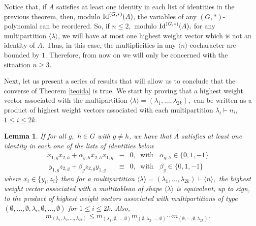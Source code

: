 \documentclass{amsart}
\newcommand{\IdG}{\ensuremath{\textnormal{Id}^{(G,\ast)}}}
\newtheorem{lema}[teorema]{Lemma}
\numberwithin{equation}{section}
\begin{document}
Notice that, if $A$ satisfies at least one identity in each list of identities in the previous theorem, then, modulo $\IdG(A)$, the variables of any $(G,*)$-polynomial can be reordered. So, if $n\leq 2,$ modulo $\IdG(A),$ for any multipartition $\langle \lambda \rangle$, we will have at most one highest weight vector which is not an identity of $A$. Thus, in this case, the multiplicities in any $\langle n \rangle$-cocharacter are bounded by $1.$ Therefore, from now on we will only be concerned with the situation $n\geq 3$.

Next, let us present a series of results that will allow us to conclude that the converse of Theorem \ref{teoida} is true. 
We start by proving that a highest weight vector associated with the multipartition $\langle \lambda \rangle = (\lambda_1,  \ldots, \lambda_{2k}), $ can be written as a product of highest weight vectors  associated with each multipartition $\lambda_{i}\vdash n_i,$ $1\leq i\leq 2k.$ 

\begin{lema}
	\label{obsum} 
If	for all $g,$ $ h \in G$ with $g \neq h$, %
    we have that
	$A$ satisfies
	at least one identity in each one of the lists of identities below 
$$\begin{array}{lcl} x_{1,g}x_{2,h}+\alpha_{g,h}x_{2,h}x_{1,g}&\equiv& 0, \;\; \mbox{with} \;\;\; \alpha_{g,h} \in \{0, 1, -1\}  \\
    ~ y_{1,g}z_{2,g}+\beta_g z_{2,g} y_{1,g}& \equiv&0, \;\;\mbox{with}\;\;\;\beta_g \in \{0, 1, -1\}\end{array}$$
    where $x_i \in \{y_i, z_i\}$
	then for a multipartition $\langle \lambda \rangle = (\lambda_{1},  \ldots,\lambda_{2k})\vdash \langle n \rangle,$ the highest weight vector  associated with a multitableau of shape $\langle \lambda \rangle$ is equivalent, up to sign, to the product of highest weight vectors associated with multipartitions of type $(\emptyset, \ldots, \emptyset, \lambda_i,\emptyset,\ldots, \emptyset)$ for $1 \le i \le 2k. $ Also, $$m_{(\lambda_1,\lambda_2,\ldots, \lambda_{2k})} \le m_{(\lambda_1,\emptyset,\ldots,\emptyset)} m_{(\emptyset,\lambda_2,\ldots,\emptyset)} \cdots m_{(\emptyset,\cdots, \emptyset,\lambda_{2k})}.$$

\end{lema}
\end{document}

